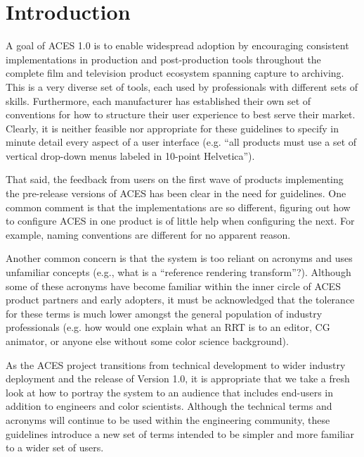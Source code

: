 \unnumberedformat	    %
\chapter{Introduction} 	%

A goal of ACES 1.0 is to enable widespread adoption by encouraging consistent implementations in production and post-production tools throughout the complete film and television product ecosystem spanning capture to archiving. This is a very diverse set of tools, each used by professionals with different sets of skills. Furthermore, each manufacturer has established their own set of conventions for how to structure their user experience to best serve their market. Clearly, it is neither feasible nor appropriate for these guidelines to specify in minute detail every aspect of a user interface (e.g. ``all products must use a set of vertical drop-down menus labeled in 10-point Helvetica'').

That said, the feedback from users on the first wave of products implementing the pre-release versions of ACES has been clear in the need for guidelines. One common comment is that the implementations are so different, figuring out how to configure ACES in one product is of little help when configuring the next. For example, naming conventions are different for no apparent reason.

Another common concern is that the system is too reliant on acronyms and uses unfamiliar concepts (e.g., what is a ``reference rendering transform''?). Although some of these acronyms have become familiar within the inner circle of ACES product partners and early adopters, it must be acknowledged that the tolerance for these terms is much lower amongst the general population of industry professionals (e.g. how would one explain what an RRT is to an editor, CG animator, or anyone else without some color science background).

As the ACES project transitions from technical development to wider industry deployment and the release of Version 1.0, it is appropriate that we take a fresh look at how to portray the system to an audience that includes end-users in addition to engineers and color scientists. Although the technical terms and acronyms will continue to be used within the engineering community, these guidelines introduce a new set of terms intended to be simpler and more familiar to a wider set of users.

